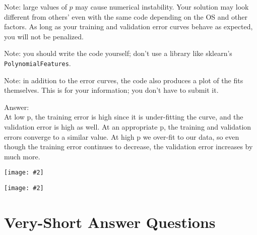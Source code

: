 \documentclass{article}
\newcommand{\gre}[1]{\textcolor{gre}{#1}}
\newcommand\ans[1]{\par\gre{Answer: #1}}
\newcommand{\centerfig}[2]{\begin{center}\texttt{[image: \#2]}\end{center}}
\begin{document}
Note: large values of $p$ may cause numerical instability. Your solution may look different from others' even with the same code depending on the OS and other factors. As long as your training and validation error curves behave as expected, you will not be penalized.

Note: you should write the code yourself; don't use a library like sklearn's \texttt{PolynomialFeatures}.

Note: in addition to the error curves, the code also produces a plot of the fits themselves. This is for your information; you don't have to submit it.
\ans{\\
At low p, the training error is high since it is under-fitting the curve, and the validation error is high as well. At an appropriate p, the training and validation errors converge to a similar value. At high p we over-fit to our data, so even though the training error continues to decrease, the validation error increases by much more.
}
\centerfig{0.8}{q4.2}
\centerfig{0.8}{figs/polynomial_error_curves}

\pagebreak

\section{Very-Short Answer Questions}
\end{document}
